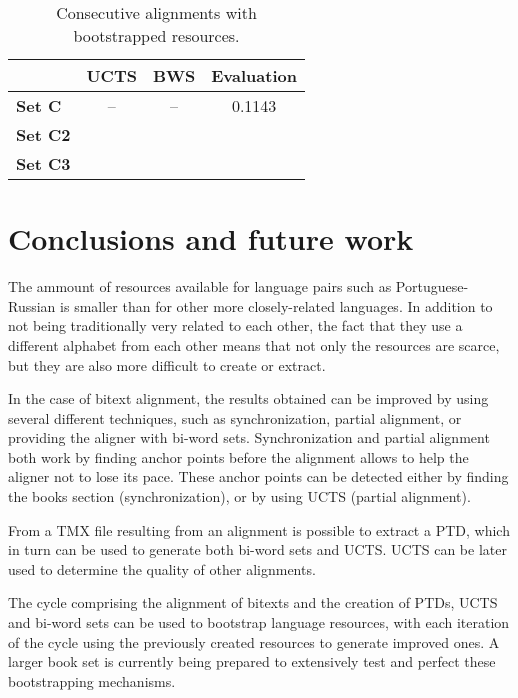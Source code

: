 \documentclass[a4paper,russian,UKenglish]{oasics}
\def\UCTSS{{\sc UCTS}}
\def\BWS{bi-word sets}
\begin{document}
\begin{table}[htb]
\centering
\caption{Consecutive alignments with bootstrapped resources.}
\label{tab:bootstrap}
\begin{tabular}{|l|c|c|c|}
\hline
                 & \textbf{UCTS} &   \textbf{BWS}   &   \textbf{Evaluation} \\\hline\hline
\textbf{Set C}   &    --         &      --          &     0.1143            \\
\textbf{Set C2}  &               &                  &                       \\
\textbf{Set C3}  &               &                  &                       \\\hline

 \hline
\end{tabular}
\end{table}


\section{Conclusions and future work}
The ammount of resources available for language pairs such as Portuguese-Russian is smaller than for other more closely-related languages. In addition to not being traditionally very related to each other, the fact that they use a different alphabet from each other means that not only the resources are scarce, but they are also more difficult to create or extract.

In the case of bitext alignment, the results obtained can be improved by using several different techniques, such as synchronization, partial alignment, or providing the aligner with \BWS{}. Synchronization and partial alignment both work by finding anchor points before the alignment allows to help the aligner not to lose its pace. These anchor points can be detected either by finding the books section (synchronization), or by using \UCTSS{} (partial alignment).

From a TMX file resulting from an alignment is possible to extract a PTD, which in turn can be used to generate both \BWS{} and \UCTSS{}. \UCTSS{} can be later used to determine the quality of other alignments.

The cycle comprising the alignment of bitexts and the creation of PTDs, \UCTSS{} and \BWS{} can be used to bootstrap language resources, with each iteration of the cycle using the previously created resources to generate improved ones. A larger book set is currently being prepared to extensively test and perfect these bootstrapping mechanisms.
\end{document}
